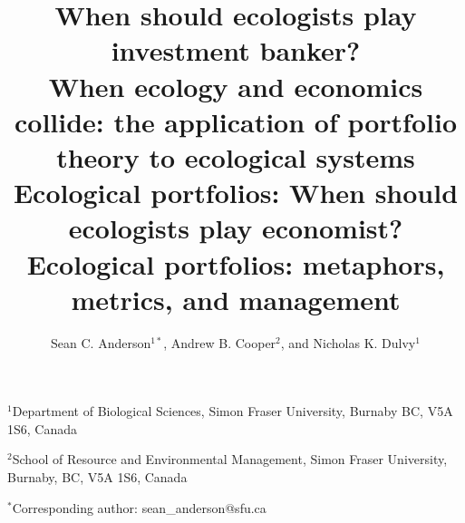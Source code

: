 \documentclass[12pt]{article}
\title{When should ecologists play investment banker?\\
  \bigskip
  When ecology and economics collide: the application of portfolio theory to ecological systems\\
  \bigskip
  Ecological portfolios: When should ecologists play economist?\\
  \bigskip
  Ecological portfolios: metaphors, metrics, and management}
\author{Sean C. Anderson$^{1\ast}$,
  Andrew B. Cooper$^2$,
  and Nicholas K. Dulvy$^1$}
\date{}
\begin{document}

\maketitle
$^1$Department of Biological Sciences, Simon Fraser University, Burnaby BC, V5A
1S6, Canada

$^2$School of Resource and Environmental Management, Simon Fraser University,
Burnaby, BC, V5A 1S6, Canada

$^{\ast}$Corresponding author: sean\_anderson@sfu.ca



\clearpage


\linenumbers
\begin{spacing}{1.5}



%
\clearpage

\clearpage

\clearpage


\end{spacing}
\end{document}
